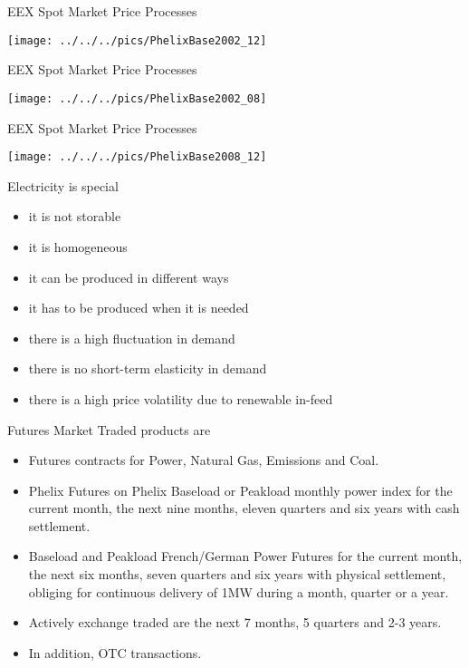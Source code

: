 {EEX Spot Market Price Processes}

\texttt{[image: ../../../pics/PhelixBase2002\_12]}


{EEX Spot Market Price Processes}

\texttt{[image: ../../../pics/PhelixBase2002\_08]}



{EEX Spot Market Price Processes}

\texttt{[image: ../../../pics/PhelixBase2008\_12]}




{Electricity is special}
\begin{itemize}
\item<1-> it is not storable
\item<2-> it is homogeneous
\item<3-> it can be produced in different ways
\item<4-> it has to be produced when it is needed
\item<5-> there is a high fluctuation in demand
\item<6-> there is no short-term elasticity in demand
\item<7-> there is a high price volatility due to renewable in-feed
\end{itemize}






{Futures Market} Traded products are
\begin{itemize}
\item<1->Futures contracts for Power, Natural Gas, Emissions and Coal.
\item<2->Phelix Futures on Phelix Baseload or Peakload monthly power index for the current month, the next nine months, eleven quarters and six years with cash settlement.
\item<3-> Baseload and Peakload French/German Power Futures for the current month, the next six months, seven quarters and six years with physical settlement, obliging for continuous delivery of 1MW during a month, quarter or a year.
\item<4-> Actively exchange traded are the next 7 months, 5 quarters and 2-3 years.
\item<5-> In addition, OTC transactions.
\end{itemize}








